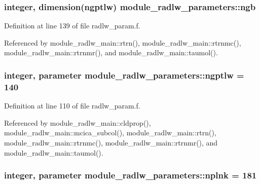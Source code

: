 \subsubsection[{\texorpdfstring{ngb}{ngb}}]{\setlength{\rightskip}{0pt plus 5cm}integer, dimension({\bf ngptlw}) module\+\_\+radlw\+\_\+parameters\+::ngb}\hypertarget{namespacemodule__radlw__parameters_a2c571bd14c9b7982a7968976858c7547}{}\label{namespacemodule__radlw__parameters_a2c571bd14c9b7982a7968976858c7547}


Definition at line 139 of file radlw\+\_\+param.\+f.



Referenced by module\+\_\+radlw\+\_\+main\+::rtrn(), module\+\_\+radlw\+\_\+main\+::rtrnmc(), module\+\_\+radlw\+\_\+main\+::rtrnmr(), and module\+\_\+radlw\+\_\+main\+::taumol().

\subsubsection[{\texorpdfstring{ngptlw}{ngptlw}}]{\setlength{\rightskip}{0pt plus 5cm}integer, parameter module\+\_\+radlw\+\_\+parameters\+::ngptlw = 140}\hypertarget{namespacemodule__radlw__parameters_a05fe17fe932ce62a3ae2c6c564584321}{}\label{namespacemodule__radlw__parameters_a05fe17fe932ce62a3ae2c6c564584321}


Definition at line 110 of file radlw\+\_\+param.\+f.



Referenced by module\+\_\+radlw\+\_\+main\+::cldprop(), module\+\_\+radlw\+\_\+main\+::mcica\+\_\+subcol(), module\+\_\+radlw\+\_\+main\+::rtrn(), module\+\_\+radlw\+\_\+main\+::rtrnmc(), module\+\_\+radlw\+\_\+main\+::rtrnmr(), and module\+\_\+radlw\+\_\+main\+::taumol().

\subsubsection[{\texorpdfstring{nplnk}{nplnk}}]{\setlength{\rightskip}{0pt plus 5cm}integer, parameter module\+\_\+radlw\+\_\+parameters\+::nplnk = 181}\hypertarget{namespacemodule__radlw__parameters_a7ade2de4de94ec6e7a0e97321143e2e6}{}\label{namespacemodule__radlw__parameters_a7ade2de4de94ec6e7a0e97321143e2e6}


